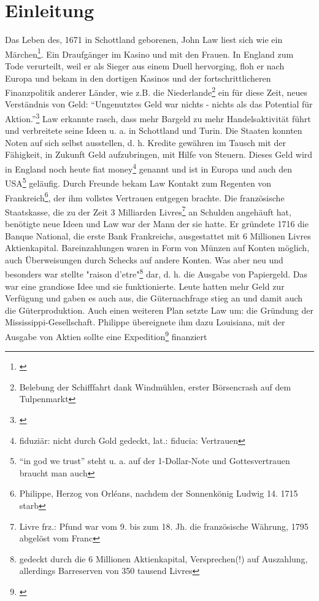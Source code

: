 \documentclass[
        onecolumn,
        a4paper,
        abstracton,
        parskip=half
        ,final
        ]{scrartcl}
\begin{document}
            \tableofcontents

            \newpage
            \onehalfspacing


\section{Einleitung}
    \label{sec1:einleitung}

Das Leben des, 1671 in Schottland geborenen, John Law liest sich wie ein M{\"a}rchen\footnote[1]{\citep*[vgl.][Kap.2]{strathern2006schumpeters}}. Ein Draufg{\"a}nger im Kasino und mit den Frauen. In England zum Tode verurteilt, weil er als Sieger aus einem Duell hervorging, floh er nach Europa und bekam in den dortigen Kasinos und der fortschrittlicheren Finanzpolitik anderer L{\"a}nder, wie z.B. die Niederlande\footnote[2]{Belebung der Schifffahrt dank Windm{\"u}hlen, erster B{\"o}rsencrash auf dem Tulpenmarkt} ein f{\"u}r diese Zeit, neues Verst{\"a}ndnis von Geld: "`Ungenutztes Geld war nichts - nichts als das Potential f{\"u}r Aktion."'\footnote[3]{\citep*[vgl.][Kap.3]{strathern2006schumpeters}} Law erkannte rasch, dass mehr Bargeld zu mehr Handelsaktivit{\"a}t f{\"u}hrt und verbreitete seine Ideen u. a. in Schottland und Turin. Die Staaten konnten Noten auf sich selbst ausstellen, d. h. Kredite gew{\"a}hren im Tausch mit der F{\"a}higkeit, in Zukunft Geld aufzubringen, mit Hilfe von Steuern. Dieses Geld wird in England noch heute fiat money\footnote[4]{fiduzi{\"a}r: nicht durch Gold gedeckt, lat.: fiducia: Vertrauen} genannt und ist in Europa und auch den USA\footnote[5]{"`in god we trust"' steht u. a. auf der 1-Dollar-Note und Gottesvertrauen braucht man auch} gel{\"a}ufig. Durch Freunde bekam Law Kontakt zum Regenten von Frankreich\footnote[6]{Philippe, Herzog von Orl\'{e}ans, nachdem der Sonnenk{\"o}nig Ludwig 14. 1715 starb}, der ihm vollstes Vertrauen entgegen brachte. Die franz{\"o}sische Staatskasse, die zu der Zeit 3 Milliarden Livres\footnote[7]{Livre frz.: Pfund war vom 9. bis zum 18. Jh. die franz{\"o}sische W{\"a}hrung, 1795 abgel{\"o}st vom Franc} an Schulden angeh{\"a}uft hat, ben{\"o}tigte neue Ideen und Law war der Mann der sie hatte. Er gr{\"u}ndete 1716 die Banque National, die erste Bank Frankreichs, ausgestattet mit 6 Millionen Livres Aktienkapital. Bareinzahlungen waren in Form von M{\"u}nzen auf Konten m{\"o}glich, auch {\"U}berweisungen durch Schecks auf andere Konten. Was aber neu und besonders war stellte "raison d'etre"\footnote[8]{gedeckt durch die 6 Millionen Aktienkapital, Versprechen(!) auf Auszahlung, allerdings Barreserven von 350 tausend Livres} dar, d. h. die Ausgabe von Papiergeld. Das war eine grandiose Idee und sie funktionierte. Leute hatten mehr Geld zur Verf{\"u}gung und gaben es auch aus, die G{\"u}ternachfrage stieg an und damit auch die G{\"u}terproduktion. Auch einen weiteren Plan setzte Law um: die Gr{\"u}ndung der Mississippi-Gesellschaft. Philippe {\"u}bereignete ihm dazu Louisiana, mit der Ausgabe von Aktien sollte eine Expedition\footnote[9]{\citep*[vgl.][Kap.3]{strathern2006schumpeters}} finanziert 
\end{document}
